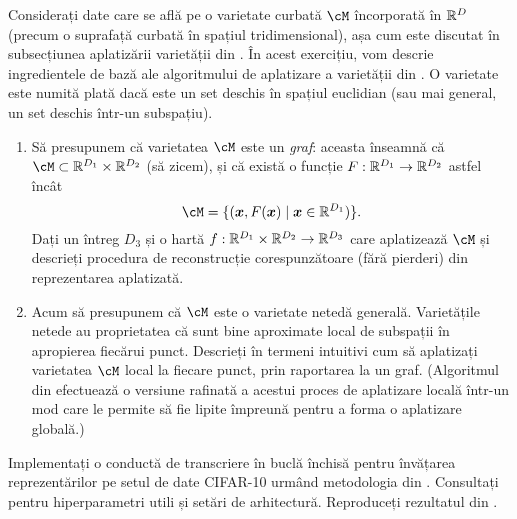 \documentclass[../../book-main_ro.tex]{subfiles}
\begin{document}
\begin{exercise}
  Considerați date care se află pe o varietate curbată $\cM$ încorporată în $\mathbb{R}^D$ (precum
  o suprafață curbată în spațiul tridimensional), așa cum este discutat în subsecțiunea
  aplatizării varietății din .
  În acest exercițiu, vom descrie ingredientele de bază ale algoritmului de
  aplatizare a varietății din \cite{Psenka-JMLR24}.
  O varietate este numită plată dacă este un set deschis în spațiul euclidian (sau
  mai general, un set deschis într-un subspațiu).

  \begin{enumerate}
    \item Să presupunem că varietatea $\cM$ este un \textit{graf}: aceasta înseamnă că $\cM
      \subset \R^{D_1} \times \R^{D_2}$ (să zicem), și că există o funcție $F
      : \mathbb{R}^{D_1} \to \mathbb{R}^{D_2}$ astfel încât
      \begin{equation}
        \cM = \set{(\x, F(\x) \mid \x \in \R^{D_1})}.
      \end{equation}
      Dați un întreg $D_3$ și o hartă $f : \mathbb{R}^{D_1} \times \mathbb{R}^{D_2} \to \mathbb{R}^{D_3}$
      care aplatizează $\cM$ și descrieți procedura de reconstrucție corespunzătoare
      (fără pierderi) din reprezentarea aplatizată.
    \item Acum să presupunem că $\cM$ este o varietate netedă generală. Varietățile netede
      au proprietatea că sunt bine aproximate local de subspații
      în apropierea fiecărui punct. Descrieți în termeni intuitivi cum să aplatizați varietatea
      $\cM$ local la fiecare punct, prin raportarea la un graf. (Algoritmul din
      \cite{Psenka-JMLR24} efectuează o versiune rafinată a acestui proces de aplatizare
      locală într-un mod care le permite să fie lipite împreună pentru a forma o aplatizare
      globală.)
  \end{enumerate}
\end{exercise}


\begin{exercise}

  Implementați o conductă de transcriere în buclă închisă pentru învățarea reprezentărilor pe
  setul de date CIFAR-10 urmând
  metodologia din .
  Consultați \cite{Dai-entropy-2022} pentru hiperparametri utili și setări de
  arhitectură. Reproduceți rezultatul din .


\end{exercise}
\end{document}
